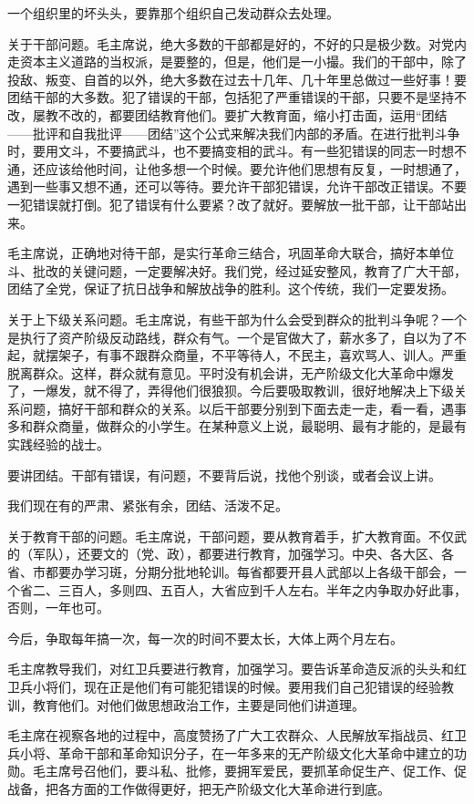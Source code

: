 一个组织里的坏头头，要靠那个组织自己发动群众去处理。

关于干部问题。毛主席说，绝大多数的干部都是好的，不好的只是极少数。对党内走资本主义道路的当权派，是要整的，但是，他们是一小撮。我们的干部中，除了投敌、叛变、自首的以外，绝大多数在过去十几年、几十年里总做过一些好事！要团结干部的大多数。犯了错误的干部，包括犯了严重错误的干部，只要不是坚持不改，屡教不改的，都要团结教育他们。要扩大教育面，缩小打击面，运用“团结——批评和自我批评——团结”这个公式来解决我们内部的矛盾。在进行批判斗争时，要用文斗，不要搞武斗，也不要搞变相的武斗。有一些犯错误的同志一时想不通，还应该给他时间，让他多想一个时候。要允许他们思想有反复，一时想通了，遇到一些事又想不通，还可以等待。要允许干部犯错误，允许干部改正错误。不要一犯错误就打倒。犯了错误有什么要紧？改了就好。要解放一批干部，让干部站出来。

毛主席说，正确地对待干部，是实行革命三结合，巩固革命大联合，搞好本单位斗、批改的关键问题，一定要解决好。我们党，经过延安整风，教育了广大干部，团结了全党，保证了抗日战争和解放战争的胜利。这个传统，我们一定要发扬。

关于上下级关系问题。毛主席说，有些干部为什么会受到群众的批判斗争呢？一个是执行了资产阶级反动路线，群众有气。一个是官做大了，薪水多了，自以为了不起，就摆架子，有事不跟群众商量，不平等待人，不民主，喜欢骂人、训人。严重脱离群众。这样，群众就有意见。平时没有机会讲，无产阶级文化大革命中爆发了，一爆发，就不得了，弄得他们很狼狈。今后要吸取教训，很好地解决上下级关系问题，搞好干部和群众的关系。以后干部要分别到下面去走一走，看一看，遇事多和群众商量，做群众的小学生。在某种意义上说，最聪明、最有才能的，是最有实践经验的战士。

要讲团结。干部有错误，有问题，不要背后说，找他个别谈，或者会议上讲。

我们现在有的严肃、紧张有余，团结、活泼不足。

关于教育干部的问题。毛主席说，干部问题，要从教育着手，扩大教育面。不仅武的（军队），还要文的（党、政），都要进行教育，加强学习。中央、各大区、各省、市都要办学习斑，分期分批地轮训。每省都要开县人武部以上各级干部会，一个省二、三百人，多则四、五百人，大省应到千人左右。半年之内争取办好此事，否则，一年也可。

今后，争取每年搞一次，每一次的时间不要太长，大体上两个月左右。

毛主席教导我们，对红卫兵要进行教育，加强学习。要告诉革命造反派的头头和红卫兵小将们，现在正是他们有可能犯错误的时候。要用我们自己犯错误的经验教训，教育他们。对他们做思想政治工作，主要是同他们讲道理。

毛主席在视察各地的过程中，高度赞扬了广大工农群众、人民解放军指战员、红卫兵小将、革命干部和革命知识分子，在一年多来的无产阶级文化大革命中建立的功勋。毛主席号召他们，要斗私、批修，要拥军爱民，要抓革命促生产、促工作、促战备，把各方面的工作做得更好，把无产阶级文化大革命进行到底。


